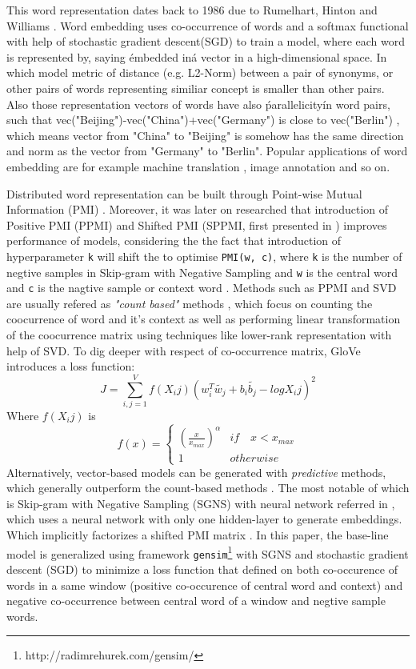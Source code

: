 \documentclass[11pt,a4paper]{article}
\begin{document}
This word representation dates back to 1986 due to Rumelhart, Hinton and Williams \cite{williams1986learning}. Word embedding uses co-occurrence of words and a softmax functional with help of stochastic gradient descent(SGD) to train a model, where each word is represented by, saying \'embedded in\' a vector in a high-dimensional space. In which model metric of distance (e.g. L2-Norm) between a pair of synonyms, or other pairs of words representing similiar concept is smaller than other pairs. Also those representation vectors of words have also \'parallelicity\' in word pairs, such that vec("Beijing")-vec("China")+vec("Germany") is close to vec("Berlin") \cite{le2014distributed}, which means vector from "China" to "Beijing" is somehow has the same direction and norm as the vector from "Germany" to "Berlin". Popular applications of word embedding are for example machine translation \cite{cho2014learning}, image annotation \cite{weston2011wsabie} and so on. 

Distributed word representation can be built through Point-wise Mutual Information (PMI) \cite{church1990word}. Moreover, it was later on researched that introduction of Positive PMI (PPMI) \cite{bullinaria2007extracting} and Shifted PMI (SPPMI, first presented in \cite{goldberg2014word2vec}) improves performance of models, considering the the fact that introduction of hyperparameter \verb|k| will shift the to optimise \verb|PMI(w, c)|, where \verb|k| is the number of negtive samples in Skip-gram with Negative Sampling and \verb|w| is the central word and \verb|c| is the nagtive sample or context word \cite{levy2014neural}. Methods such as PPMI and SVD are usually refered as \emph{"count based"} methods \cite{levy2015improving}, which focus on counting the coocurrence of word and it's context as well as performing linear transformation of the coocurrence matrix using techniques like lower-rank representation with help of SVD. To dig deeper with respect of co-occurrence matrix, GloVe \cite{Pennington2014glove} introduces a loss function:
$$J=\sum_{i,j=1}^{V}f(X_ij)(w_i^T\tilde{w_j}+b_i\tilde{b_j}-logX_ij)^2$$
Where $f(X_ij)$ is
$$ f(x)=\left\{
    \begin{array}{rl}
    (\frac{x}{x_{max}})^\alpha & if\quad x<x_{max}\\
    1 & otherwise
    \end{array}
\right.
$$
Alternatively, vector-based models can be generated with \emph{predictive} methods, which generally outperform the count-based methods \cite{levy2015improving}. The most notable of which is Skip-gram with Negative Sampling (SGNS) with neural network referred in \cite{mikolov2013distributed}, which uses a neural network with only one hidden-layer to generate embeddings. Which implicitly factorizes a shifted PMI matrix \cite{levy2014neural}. In this paper, the base-line model is generalized using framework \verb|gensim|\footnote{http://radimrehurek.com/gensim/} with SGNS and stochastic gradient descent (SGD) to minimize a loss function that defined on both co-occurence of words in a same window (positive co-occurence of central word and context) and negative co-occurrence between central word of a window and negtive sample words. 
\end{document}
